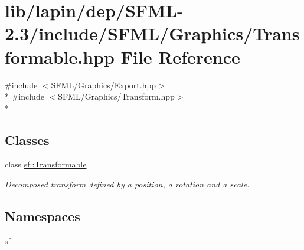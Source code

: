\hypertarget{lapin_2dep_2_s_f_m_l-2_83_2include_2_s_f_m_l_2_graphics_2_transformable_8hpp}{\section{lib/lapin/dep/\-S\-F\-M\-L-\/2.3/include/\-S\-F\-M\-L/\-Graphics/\-Transformable.hpp File Reference}
\label{lapin_2dep_2_s_f_m_l-2_83_2include_2_s_f_m_l_2_graphics_2_transformable_8hpp}
}
{\ttfamily \#include $<$S\-F\-M\-L/\-Graphics/\-Export.\-hpp$>$}\\*
{\ttfamily \#include $<$S\-F\-M\-L/\-Graphics/\-Transform.\-hpp$>$}\\*
\subsection*{Classes}
\begin{DoxyCompactItemize}
\item 
class \hyperlink{classsf_1_1_transformable}{sf\-::\-Transformable}
\begin{DoxyCompactList}\small\item\em Decomposed transform defined by a position, a rotation and a scale. \end{DoxyCompactList}\end{DoxyCompactItemize}
\subsection*{Namespaces}
\begin{DoxyCompactItemize}
\item 
\hyperlink{namespacesf}{sf}
\end{DoxyCompactItemize}
